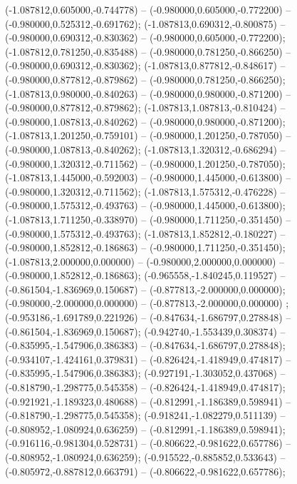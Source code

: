  (-1.087812,0.605000,-0.744778) -- (-0.980000,0.605000,-0.772200) -- (-0.980000,0.525312,-0.691762);
 (-1.087813,0.690312,-0.800875) -- (-0.980000,0.690312,-0.830362) -- (-0.980000,0.605000,-0.772200);
 (-1.087812,0.781250,-0.835488) -- (-0.980000,0.781250,-0.866250) -- (-0.980000,0.690312,-0.830362);
 (-1.087813,0.877812,-0.848617) -- (-0.980000,0.877812,-0.879862) -- (-0.980000,0.781250,-0.866250);
 (-1.087813,0.980000,-0.840263) -- (-0.980000,0.980000,-0.871200) -- (-0.980000,0.877812,-0.879862);
 (-1.087813,1.087813,-0.810424) -- (-0.980000,1.087813,-0.840262) -- (-0.980000,0.980000,-0.871200);
 (-1.087813,1.201250,-0.759101) -- (-0.980000,1.201250,-0.787050) -- (-0.980000,1.087813,-0.840262);
 (-1.087813,1.320312,-0.686294) -- (-0.980000,1.320312,-0.711562) -- (-0.980000,1.201250,-0.787050);
 (-1.087813,1.445000,-0.592003) -- (-0.980000,1.445000,-0.613800) -- (-0.980000,1.320312,-0.711562);
 (-1.087813,1.575312,-0.476228) -- (-0.980000,1.575312,-0.493763) -- (-0.980000,1.445000,-0.613800);
 (-1.087813,1.711250,-0.338970) -- (-0.980000,1.711250,-0.351450) -- (-0.980000,1.575312,-0.493763);
 (-1.087813,1.852812,-0.180227) -- (-0.980000,1.852812,-0.186863) -- (-0.980000,1.711250,-0.351450);
 (-1.087813,2.000000,0.000000) -- (-0.980000,2.000000,0.000000) -- (-0.980000,1.852812,-0.186863);
 (-0.965558,-1.840245,0.119527) -- (-0.861504,-1.836969,0.150687) -- (-0.877813,-2.000000,0.000000);
 (-0.980000,-2.000000,0.000000) -- (-0.877813,-2.000000,0.000000) ;
 (-0.953186,-1.691789,0.221926) -- (-0.847634,-1.686797,0.278848) -- (-0.861504,-1.836969,0.150687);
 (-0.942740,-1.553439,0.308374) -- (-0.835995,-1.547906,0.386383) -- (-0.847634,-1.686797,0.278848);
 (-0.934107,-1.424161,0.379831) -- (-0.826424,-1.418949,0.474817) -- (-0.835995,-1.547906,0.386383);
 (-0.927191,-1.303052,0.437068) -- (-0.818790,-1.298775,0.545358) -- (-0.826424,-1.418949,0.474817);
 (-0.921921,-1.189323,0.480688) -- (-0.812991,-1.186389,0.598941) -- (-0.818790,-1.298775,0.545358);
 (-0.918241,-1.082279,0.511139) -- (-0.808952,-1.080924,0.636259) -- (-0.812991,-1.186389,0.598941);
 (-0.916116,-0.981304,0.528731) -- (-0.806622,-0.981622,0.657786) -- (-0.808952,-1.080924,0.636259);
 (-0.915522,-0.885852,0.533643) -- (-0.805972,-0.887812,0.663791) -- (-0.806622,-0.981622,0.657786);
